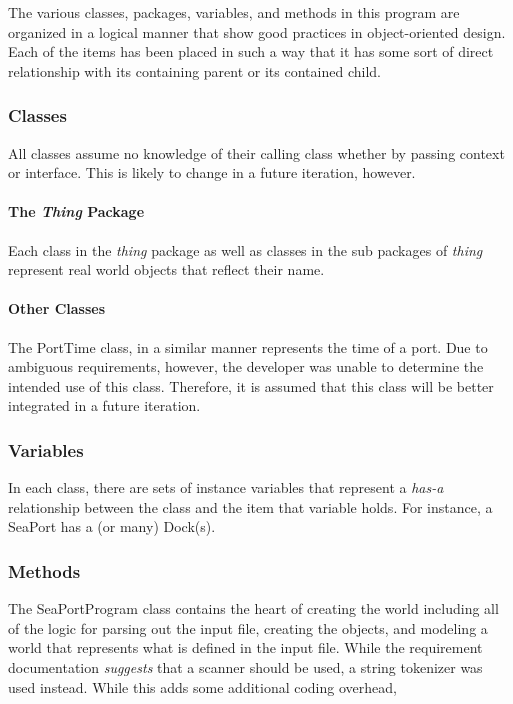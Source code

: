 \documentclass[english,floatsintext,man]{apa6}
\begin{document}
The various classes, packages, variables, and methods in this program
are organized in a logical manner that show good practices in
object-oriented design. Each of the items has been placed in such a way
that it has some sort of direct relationship with its containing parent
or its contained child.

\subsubsection{Classes}\label{classes}

All classes assume no knowledge of their calling class whether by
passing context or interface. This is likely to change in a future
iteration, however.

\paragraph{\texorpdfstring{The \emph{Thing}
Package}{The Thing Package}}\label{the-thing-package}

Each class in the \emph{thing} package as well as classes in the sub
packages of \emph{thing} represent real world objects that reflect their
name.

\paragraph{Other Classes}\label{other-classes}

The PortTime class, in a similar manner represents the time of a port.
Due to ambiguous requirements, however, the developer was unable to
determine the intended use of this class. Therefore, it is assumed that
this class will be better integrated in a future iteration.

\subsubsection{Variables}\label{variables}

In each class, there are sets of instance variables that represent a
\emph{has-a} relationship between the class and the item that variable
holds. For instance, a SeaPort has a (or many) Dock(s).

\subsubsection{Methods}\label{methods}

The SeaPortProgram class contains the heart of creating the world
including all of the logic for parsing out the input file, creating the
objects, and modeling a world that represents what is defined in the
input file. While the requirement documentation \emph{suggests} that a
scanner should be used, a string tokenizer was used instead. While this
adds some additional coding overhead,
\end{document}
